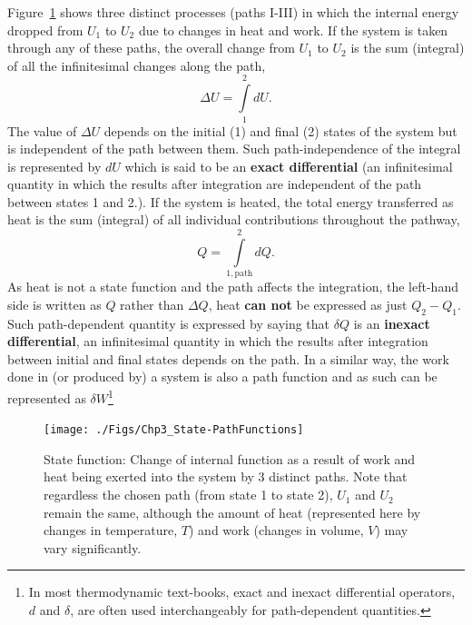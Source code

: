         Figure~\ref{Chapter:FirstLaw:Fig:StateFunctions} shows three distinct processes (paths I-III) in which the internal energy dropped from $U_{1}$ to $U_{2}$ due to changes in heat and work. If the system is taken through any of these paths, the overall change from $U_{1}$ to $U_{2}$ is the sum (\ie integral) of all the infinitesimal changes along the path,
        \begin{displaymath}
             \Delta U = \int\limits_{1}^{2} dU.
        \end{displaymath}
        The value of $\Delta U$ depends on the initial (1) and final (2) states of the system but is independent of the path between them. Such path-independence of the integral is represented by $dU$ which is said to be an {\bf exact differential} (\ie an infinitesimal quantity in which the results after integration are independent of the path between states 1 and 2.). If the system is heated, the total energy transferred as heat is the sum (\ie integral) of all individual contributions throughout the pathway,
        \begin{displaymath}
             Q = \int\limits_{1,\text{path}}^{2}dQ.
        \end{displaymath}
        As heat is not a state function and the path affects the integration, the left-hand side is written as $Q$ rather than $\Delta Q$, \ie heat {\bf can not} be expressed as just $Q_{2}-Q_{1}$. Such path-dependent quantity is expressed by saying that $\delta Q$ is an {\bf inexact differential}, \ie an infinitesimal quantity in which the results after integration between initial and final states depends on the path.  In a similar way, the work done in  (or produced by) a system is also a path function and as such can be represented as $\delta W$\footnote{In most thermodynamic text-books, exact and inexact differential operators, $d$ and $\delta$, are often used interchangeably for path-dependent quantities.}
   \begin{figure}[h]
     \begin{center}
       \texttt{[image: ./Figs/Chp3\_State-PathFunctions]}
        \caption{State function: Change of internal function as a result of work and heat being exerted into the system by 3 distinct paths. Note that regardless the chosen path (from state 1 to state 2), $U_{1}$ and $U_{2}$ remain the same, although the amount of heat (represented here by changes in temperature, $T$) and work (\ie changes in volume, $V$) may vary significantly.}\label{Chapter:FirstLaw:Fig:StateFunctions}
     \end{center}
   \end{figure}
   
